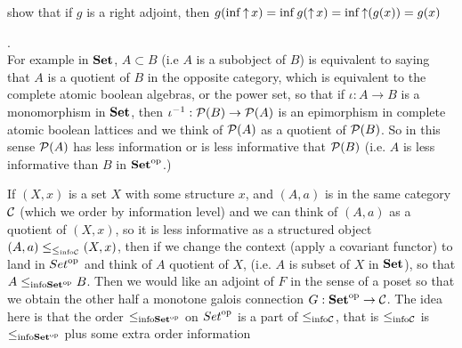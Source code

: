 \documentclass{book}
\begin{document}
	\begin{ex}
		show that if $g$ is a right adjoint, then $g(\inf \operatorname{\uparrow} x) = \inf g(\operatorname{\uparrow} x) = \inf \operatorname{\uparrow}(g(x)) = g(x)$
	\end{ex}
	
	\begin{ex}
		
	\end{ex}
	
	.\\
	
	For example in $\text{\textbf{Set}}$, $A \subset B$ (i.e $A$ is a subobject of $B$) is equivalent to saying that $A$ is a quotient of $B$ in the opposite category, which is equivalent to the complete atomic boolean algebras, or the power set, so that if $\iota:A \rightarrow B$ is a monomorphism in $\text{\textbf{Set}}$, then $\iota^{-1}: \mathcal{P}(B) \rightarrow \mathcal{P}(A)$ is an epimorphism in complete atomic boolean lattices and we think of $\mathcal{P}(A)$ as a quotient of $\mathcal{P}(B)$. So in this sense $\mathcal{P}(A)$ has less information or is less informative that $\mathcal{P}(B)$  (i.e. $A$ is less informative than $B$ in ${\text{\textbf{Set}}}^{\text{op}}$.)
	
	If $(X, x)$ is a set $X$ with some structure $x$, and $(A, a)$ is in the same category $\mathcal{C}$ (which we order by information level) and we can think of $(A, a)$ as a quotient of $(X, x)$, so it is less informative as a structured object $(A, a) \leq_{\leq_{\text{info} \mathcal{C}}} (X, x)$, then if we change the context (apply a covariant functor) to land in ${Set}^{\text{op}}$ and think of $A$ quotient of $X$, (i.e. $A$ is subset of $X$ in $\text{\textbf{Set}}$), so that $A \leq_{\text{info} {\text{\textbf{Set}}}^{\text{op}}} B$. Then we would like an adjoint of $F$ in the sense of a poset so that we obtain the other half a monotone galois connection $G: {\text{\textbf{Set}}}^{\text{op}} \rightarrow \mathcal{C}$. The idea here is that the order $\leq_{\text{info} {\text{\textbf{Set}}}^{\text{op}}}$ on ${Set}^{\text{op}}$ is a part of $\leq_{\text{info} \mathcal{C}}$, that is $\leq_{\text{info} \mathcal{C}}$ is $\leq_{\text{info} {\text{\textbf{Set}}}^{\text{op}}}$ plus some extra order information \\
	
\end{document}
